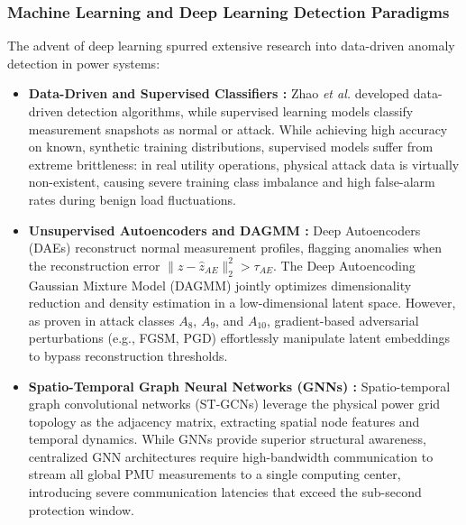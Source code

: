\documentclass[journal,compsoc]{IEEEtran}
\begin{document}
\subsubsection{Machine Learning and Deep Learning Detection Paradigms}
The advent of deep learning spurred extensive research into data-driven anomaly detection in power systems:
\begin{itemize}
    \item \textbf{Data-Driven and Supervised Classifiers \cite{ref20, ref62, ref66, ref84}:} Zhao \textit{et al.} \cite{ref20} developed data-driven detection algorithms, while supervised learning models classify measurement snapshots as normal or attack. While achieving high accuracy on known, synthetic training distributions, supervised models suffer from extreme brittleness: in real utility operations, physical attack data is virtually non-existent, causing severe training class imbalance and high false-alarm rates during benign load fluctuations.
    \item \textbf{Unsupervised Autoencoders and DAGMM \cite{ref40}:} Deep Autoencoders (DAEs) reconstruct normal measurement profiles, flagging anomalies when the reconstruction error $\|z - \hat{z}_{AE}\|_2^2 > \tau_{AE}$. The Deep Autoencoding Gaussian Mixture Model (DAGMM) jointly optimizes dimensionality reduction and density estimation in a low-dimensional latent space. However, as proven in attack classes $A_8$, $A_9$, and $A_{10}$, gradient-based adversarial perturbations (e.g., FGSM, PGD) effortlessly manipulate latent embeddings to bypass reconstruction thresholds.
    \item \textbf{Spatio-Temporal Graph Neural Networks (GNNs) \cite{ref68}:} Spatio-temporal graph convolutional networks (ST-GCNs) leverage the physical power grid topology as the adjacency matrix, extracting spatial node features and temporal dynamics. While GNNs provide superior structural awareness, centralized GNN architectures require high-bandwidth communication to stream all global PMU measurements to a single computing center, introducing severe communication latencies that exceed the sub-second protection window.
\end{itemize}
\end{document}
